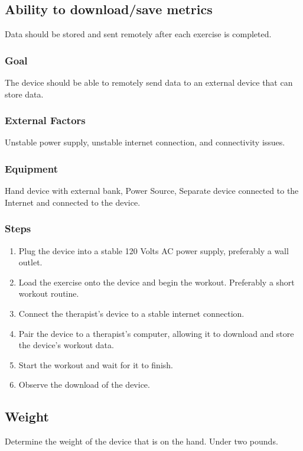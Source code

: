 \documentclass{article}
\begin{document}
\subsection{Ability to download/save metrics}
Data should be stored and sent remotely after each exercise is completed.

\subsubsection{Goal} The device should be able to remotely send data to an external device that can store data.

\subsubsection{External Factors} Unstable power supply, unstable internet connection, and connectivity issues.

\subsubsection{Equipment} Hand device with external bank, Power Source, Separate device connected to the Internet and connected to the device.

\subsubsection{Steps}
\begin{enumerate}
\item Plug the device into a stable 120 Volts AC power supply, preferably a wall outlet.
\item Load the exercise onto the device and begin the workout. Preferably a short workout routine.
\item Connect the therapist's device to a stable internet connection.
\item Pair the device to a therapist's computer, allowing it to download and store the device's workout data.
\item Start the workout and wait for it to finish.
\item Observe the download of the device.
\end{enumerate}

\subsection{Weight}
Determine the weight of the device that is on the hand. Under two pounds.
\end{document}
